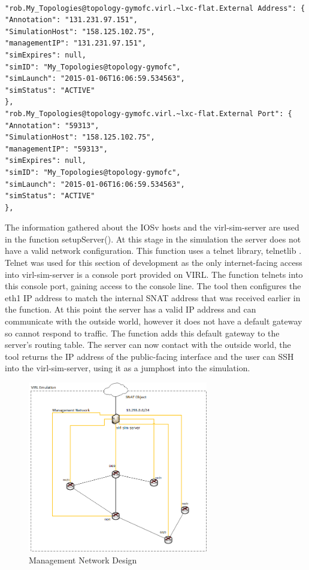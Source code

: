 \documentclass[11pt]{report}
\begin{document}
\begin{lstlisting}[caption=Extract of /roster/rest information]

"rob.My_Topologies@topology-gymofc.virl.~lxc-flat.External Address": {
"Annotation": "131.231.97.151",
"SimulationHost": "158.125.102.75",
"managementIP": "131.231.97.151",
"simExpires": null,
"simID": "My_Topologies@topology-gymofc",
"simLaunch": "2015-01-06T16:06:59.534563",
"simStatus": "ACTIVE"
},
"rob.My_Topologies@topology-gymofc.virl.~lxc-flat.External Port": {
"Annotation": "59313",
"SimulationHost": "158.125.102.75",
"managementIP": "59313",
"simExpires": null,
"simID": "My_Topologies@topology-gymofc",
"simLaunch": "2015-01-06T16:06:59.534563",
"simStatus": "ACTIVE"
},

\end{lstlisting}

The information gathered about the IOSv hosts and the virl-sim-server are used in the function setupServer(). At this stage in the simulation the server does not have a valid network configuration. This function uses a telnet library, telnetlib \citep{telnetlib}. Telnet was used for this section of development as the only internet-facing access into virl-sim-server is a console port provided on VIRL. The function telnets into this console port, gaining access to the console line. The tool then configures the eth1 IP address to match the internal SNAT address that was received earlier in the function. At this point the server has a valid IP address and can communicate with the outside world, however it does not have a default gateway so cannot respond to traffic. The function adds this default gateway to the server's routing table. The server can now contact with the outside world, the tool returns the IP address of the public-facing interface and the user can SSH into the virl-sim-server, using it as a jumphost into the simulation.

\begin{figure}[h!]
	\caption{Management Network Design}
	\centering
	\includegraphics[width=0.7\textwidth]{managementNet.png}
\end{figure}
\end{document}
